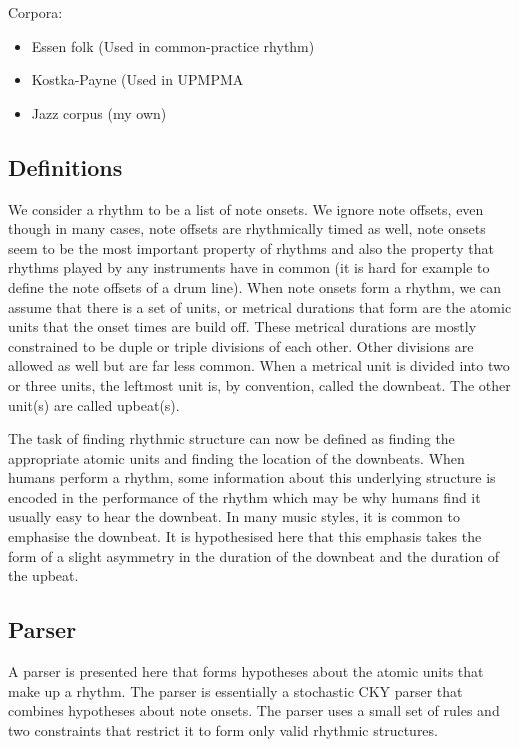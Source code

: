 Corpora:
\begin{itemize}
\item Essen folk (Used in common-practice rhythm)
\item Kostka-Payne (Used in UPMPMA
\item Jazz corpus (my own)
\end{itemize}

\subsection{Definitions}

We consider a rhythm to be a list of note onsets. We ignore note offsets, even though in many cases, note offsets are rhythmically timed as well, note onsets seem to be the most important property of rhythms and also the property that rhythms played by any instruments have in common (it is hard for example to define the note offsets of a drum line). When note onsets form a rhythm, we can assume that there is a set of units, or metrical durations that form are the atomic units that the onset times are build off. These metrical durations are mostly constrained to be duple or triple divisions of each other. Other divisions are allowed as well but are far less common. When a metrical unit is divided into two or three units, the leftmost unit is, by convention, called the downbeat. The other unit(s) are called upbeat(s).

The task of finding rhythmic structure can now be defined as finding the appropriate atomic units and finding the location of the downbeats. When humans perform a rhythm, some information about this underlying structure is encoded in the performance of the rhythm which may be why humans find it usually easy to hear the downbeat. In many music styles, it is common to emphasise the downbeat. It is hypothesised here that this emphasis takes the form of a slight asymmetry in the duration of the downbeat and the duration of the upbeat.

\subsection{Parser}

A parser is presented here that forms hypotheses about the atomic units that make up a rhythm. The parser is essentially a stochastic CKY parser that combines hypotheses about note onsets. The parser uses a small set of rules and two constraints that restrict it to form only valid rhythmic structures. 

